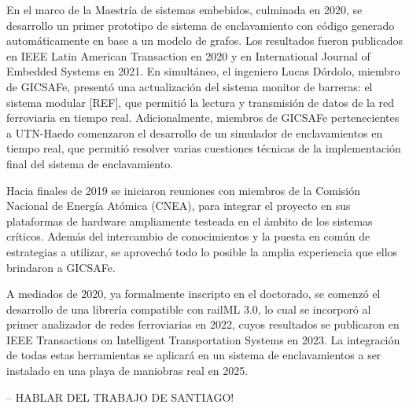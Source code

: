     En el marco de la Maestría de sistemas embebidos, culminada en 2020, se desarrollo un primer prototipo de sistema de enclavamiento con código generado automáticamente en base a un modelo de grafos. Los resultados fueron publicados en IEEE Latin American Transaction en 2020 y en International Journal of Embedded Systems en 2021. En simultáneo, el ingeniero Lucas Dórdolo, miembro de GICSAFe, presentó una actualización del sistema monitor de barreras: el sistema modular [REF], que permitió la lectura y transmisión de datos de la red ferroviaria en tiempo real. Adicionalmente, miembros de GICSAFe pertenecientes a UTN-Haedo comenzaron el desarrollo de un simulador de enclavamientos en tiempo real, que permitió resolver varias cuestiones técnicas de la implementación final del sistema de enclavamiento.

    Hacia finales de 2019 se iniciaron reuniones con miembros de la Comisión Nacional de Energía Atómica (CNEA), para integrar el proyecto en sus plataformas de hardware ampliamente testeada en el ámbito de los sistemas críticos. Además del intercambio de conocimientos y la puesta en común de estrategias a utilizar, se aprovechó todo lo posible la amplia experiencia que ellos brindaron a GICSAFe.
    
    A mediados de 2020, ya formalmente inscripto en el doctorado, se comenzó el desarrollo de una librería compatible con railML 3.0, lo cual se incorporó al primer analizador de redes ferroviarias en 2022, cuyos resultados se publicaron en IEEE Transactions on Intelligent Transportation Systems en 2023. La integración de todas estas herramientas se aplicará en un sistema de enclavamientos a ser instalado en una playa de maniobras real en 2025.

    -- HABLAR DEL TRABAJO DE SANTIAGO!